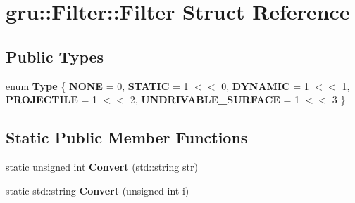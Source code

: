 \hypertarget{structgru_1_1Filter_1_1Filter}{\section{gru\-:\-:\-Filter\-:\-:\-Filter \-Struct \-Reference}
\label{structgru_1_1Filter_1_1Filter}
}
\subsection*{\-Public \-Types}
\begin{DoxyCompactItemize}
\item 
enum {\bfseries \-Type} \{ \*
{\bfseries \-N\-O\-N\-E} =  0, 
{\bfseries \-S\-T\-A\-T\-I\-C} =  1 $<$$<$ 0, 
{\bfseries \-D\-Y\-N\-A\-M\-I\-C} =  1 $<$$<$ 1, 
{\bfseries \-P\-R\-O\-J\-E\-C\-T\-I\-L\-E} =  1 $<$$<$ 2, 
\*
{\bfseries \-U\-N\-D\-R\-I\-V\-A\-B\-L\-E\-\_\-\-S\-U\-R\-F\-A\-C\-E} =  1 $<$$<$ 3
 \}
\end{DoxyCompactItemize}
\subsection*{\-Static \-Public \-Member \-Functions}
\begin{DoxyCompactItemize}
\item 
\hypertarget{structgru_1_1Filter_1_1Filter_abcb5591f114d1d0848fbf0ceb3d3097d}{static unsigned int {\bfseries \-Convert} (std\-::string str)}\label{structgru_1_1Filter_1_1Filter_abcb5591f114d1d0848fbf0ceb3d3097d}

\item 
\hypertarget{structgru_1_1Filter_1_1Filter_a71bb2506a9f12d9a8baf2fb38a28722f}{static std\-::string {\bfseries \-Convert} (unsigned int i)}\label{structgru_1_1Filter_1_1Filter_a71bb2506a9f12d9a8baf2fb38a28722f}

\end{DoxyCompactItemize}
